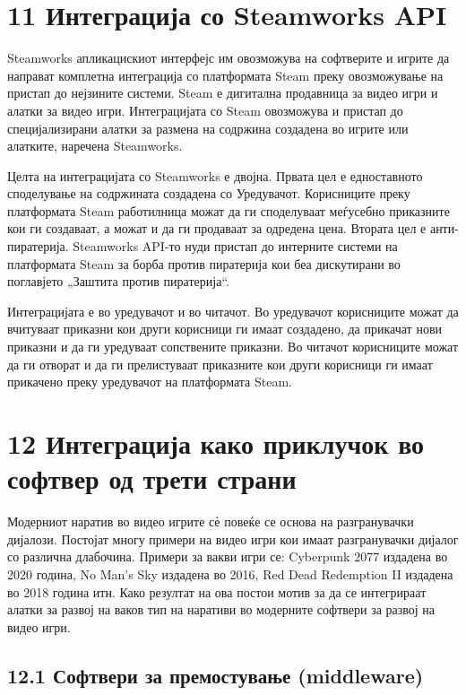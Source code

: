\section{11 Интеграција со Steamworks API}

Steamworks апликацискиот интерфејс им овозможува на софтверите и игрите да направат комплетна интеграција со платформата Steam преку овозможување на пристап до нејзините системи. Steam е дигитална продавница за видео игри и алатки за видео игри. Интеграцијата со Steam овозможува и пристап до специјализирани алатки за размена на содржина создадена во игрите или алатките, наречена Steamworks.

Целта на интеграцијата со Steamworks е двојна. Првата цел е едноставното споделување на содржината создадена со Уредувачот. Корисниците преку платформата Steam работилница можат да ги споделуваат меѓусебно приказните кои ги создаваат, а можат и да ги продаваат за одредена цена. Втората цел е анти-пиратерија. Steamworks API-то нуди пристап до интерните системи на платформата Steam за борба против пиратерија кои беа дискутирани во поглавјето „Заштита против пиратерија“.

Интеграцијата е во уредувачот и во читачот. Во уредувачот корисниците можат да вчитуваат приказни кои други корисници ги имаат создадено, да прикачат нови приказни и да ги уредуваат сопствените приказни. Во читачот корисниците можат да ги отворат и да ги прелистуваат приказните кои други корисници ги имаат прикачено преку уредувачот на платформата Steam.

\section{12 Интеграција како приклучок во софтвер од трети страни}


Модерниот наратив во видео игрите сѐ повеќе се основа на разгранувачки дијалози. Постојат многу примери на видео игри кои имаат разгранувачки дијалог со различна длабочина. Примери за вакви игри се: Cyberpunk 2077 издадена во 2020 година, No Man’s Sky издадена во 2016, Red Dead Redemption II издадена во 2018 година итн. Како резултат на ова постои мотив за да се интегрираат алатки за развој на ваков тип на наративи во модерните софтвери за развој на видео игри.

\subsection{12.1 Софтвери за премостување (middleware)}

